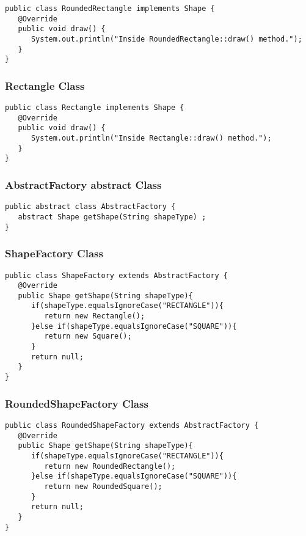 \begin{verbatim}
public class RoundedRectangle implements Shape {
   @Override
   public void draw() {
      System.out.println("Inside RoundedRectangle::draw() method.");
   }
}
\end{verbatim}

\subsubsection{Rectangle Class}

\begin{verbatim}
public class Rectangle implements Shape {
   @Override
   public void draw() {
      System.out.println("Inside Rectangle::draw() method.");
   }
}
\end{verbatim}

\subsubsection{AbstractFactory abstract Class}

\begin{verbatim}
public abstract class AbstractFactory {
   abstract Shape getShape(String shapeType) ;
}
\end{verbatim}

\subsubsection{ShapeFactory Class}

\begin{verbatim}
public class ShapeFactory extends AbstractFactory {
   @Override
   public Shape getShape(String shapeType){    
      if(shapeType.equalsIgnoreCase("RECTANGLE")){
         return new Rectangle();         
      }else if(shapeType.equalsIgnoreCase("SQUARE")){
         return new Square();
      }	 
      return null;
   }
}
\end{verbatim}

\subsubsection{RoundedShapeFactory Class}

\begin{verbatim}
public class RoundedShapeFactory extends AbstractFactory {
   @Override
   public Shape getShape(String shapeType){    
      if(shapeType.equalsIgnoreCase("RECTANGLE")){
         return new RoundedRectangle();         
      }else if(shapeType.equalsIgnoreCase("SQUARE")){
         return new RoundedSquare();
      }	 
      return null;
   }
}
\end{verbatim}


